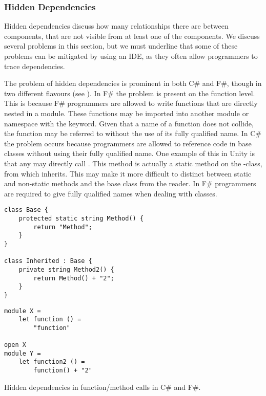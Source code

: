\subsubsection{Hidden Dependencies}
Hidden dependencies discuss how many relationships there are between components, that are not visible from at least one of the components. We discuss several problems in this section, but we must underline that some of these problems can be mitigated by using an \gls{IDE}, as they often allow programmers to trace dependencies.

The problem of hidden dependencies is prominent in both C\# and F\#, though in two different flavours (see ). In F\# the problem is present on the function level. This is because F\# programmers are allowed to write functions that are directly nested in a module. These functions may be imported into another module or namespace with the  keyword. Given that a name of a function does not collide, the function may be referred to without the use of its fully qualified name. In C\# the problem occurs because programmers are allowed to reference code in base classes without using their fully qualified name. One example of this in Unity is that any  may directly call . This method is actually a static method on the -class, from which  inherits. This may make it more difficult to distinct between static and non-static methods and  the base class from the reader. In F\# programmers are required to give fully qualified names when dealing with classes.

\begin{listing}[H]
    \begin{minipage}{.50\textwidth}
        \begin{verbatim}
class Base {
    protected static string Method() {
        return "Method";
    }
}

class Inherited : Base {
    private string Method2() {
        return Method() + "2";
    }
}
        \end{verbatim}
    \end{minipage}
    \hfill
    \begin{minipage}{.40\textwidth}
        \begin{verbatim}
module X =
    let function () =
        "function"

open X
module Y =
    let function2 () =
        function() + "2"
        \end{verbatim}
    \end{minipage}
\caption{Hidden dependencies in function/method calls in C\# and F\#.}
\label{lst:hidden:dependencies}
\end{listing}

